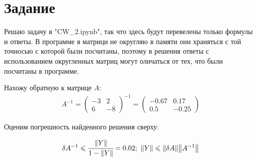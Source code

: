 \section{Задание}

Решаю задачу в "CW\_2.ipynb", так что здесь будут перевелены только формулы и ответы. В программе я матрици не округляю в памяти они храняться 
с той точносью с которой были посчитаны, поэтому в решения ответы с использованием округленных матриц могут оличаться от тех, что были посчитаны
в программе.

Нахожу обратную к матрице $A$:
\begin{gather}
    A^{-1} = 
    \begin{pmatrix}
        -3& 2\\
        6& -8
    \end{pmatrix} ^{-1}
    = 
    \begin{pmatrix}
        -0.67 & 0.17\\ 
        0.5 & -0.25
    \end{pmatrix}    
\end{gather}

Оценим погрешность найденного решения сверху:


\begin{gather}
    \delta A^{-1} \leqslant \cfrac{\norm{Y}}{1 - \norm{Y}} = 0.02; \ \norm{Y} \leqslant \norm{\delta A}\norm{A^{-1}} 
\end{gather}




